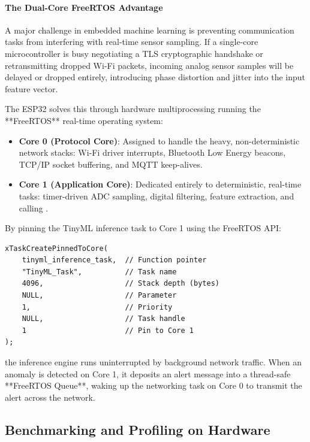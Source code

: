 \paragraph{The Dual-Core FreeRTOS Advantage}
A major challenge in embedded machine learning is preventing communication tasks from interfering with real-time sensor sampling. If a single-core microcontroller is busy negotiating a TLS cryptographic handshake or retransmitting dropped Wi-Fi packets, incoming analog sensor samples will be delayed or dropped entirely, introducing phase distortion and jitter into the input feature vector.

The ESP32 solves this through hardware multiprocessing running the **FreeRTOS** real-time operating system:
\begin{itemize}
    \item \textbf{Core 0 (Protocol Core)}: Assigned to handle the heavy, non-deterministic network stacks: Wi-Fi driver interrupts, Bluetooth Low Energy beacons, TCP/IP socket buffering, and MQTT keep-alives.
    \item \textbf{Core 1 (Application Core)}: Dedicated entirely to deterministic, real-time tasks: timer-driven ADC sampling, digital filtering, feature extraction, and calling .
\end{itemize}

By pinning the TinyML inference task to Core 1 using the FreeRTOS API:
\begin{lstlisting}[style=pythonstyle, numbers=none]
xTaskCreatePinnedToCore(
    tinyml_inference_task,  // Function pointer
    "TinyML_Task",          // Task name
    4096,                   // Stack depth (bytes)
    NULL,                   // Parameter
    1,                      // Priority
    NULL,                   // Task handle
    1                       // Pin to Core 1
);
\end{lstlisting}
the inference engine runs uninterrupted by background network traffic. When an anomaly is detected on Core 1, it deposits an alert message into a thread-safe **FreeRTOS Queue**, waking up the networking task on Core 0 to transmit the alert across the network.

\subsection{Benchmarking and Profiling on Hardware}\label{subsec:benchmarking}

